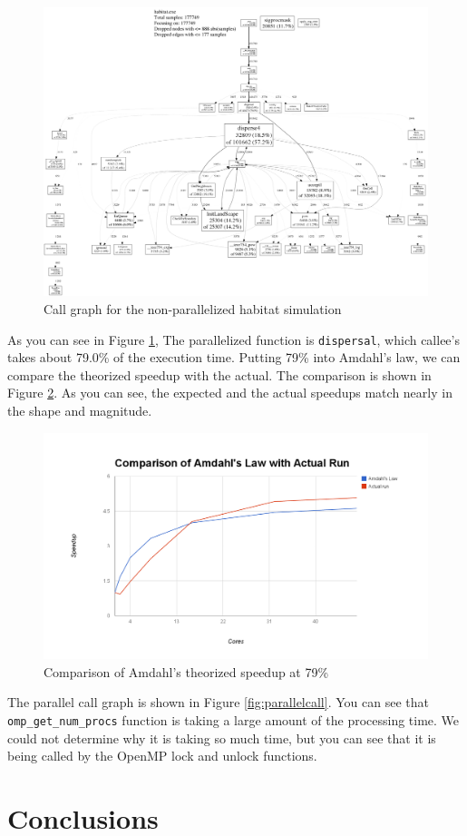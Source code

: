 \documentclass[12pt, notitlepage]{article}
\begin{document}
\begin{figure}[ht]
\includegraphics[width=\textwidth]{Include/originalcall.pdf}
\caption{Call graph for the non-parallelized habitat simulation} \label{fig:originalcall}
\end{figure}


As you can see in Figure \ref{fig:originalcall}, The parallelized function is \texttt{dispersal}, which callee's takes about 79.0\% of the execution time.  Putting 79\% into Amdahl's law, we can compare the theorized speedup with the actual.  The comparison is shown in Figure \ref{fig:amdahls}.  As you can see, the expected and the actual speedups match nearly in the shape and magnitude.  

\begin{figure}[ht]
\includegraphics[width=\textwidth]{Include/amdahls.png}
\caption{Comparison of Amdahl's theorized speedup at 79\%} \label{fig:amdahls}
\end{figure}

The parallel call graph is shown in Figure \ref{fig:parallelcall}.  You can see that \texttt{omp_get_num_procs} function is taking a large amount of the processing time.  We could not determine why it is taking so much time, but you can see that it is being called by the OpenMP lock and unlock functions.

\section{Conclusions}
\end{document}
